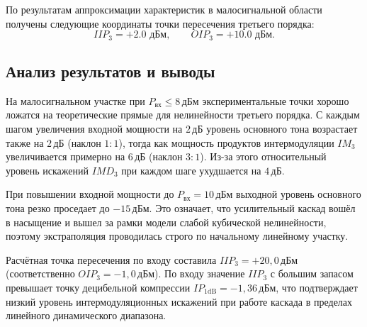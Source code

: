 По результатам аппроксимации характеристик в малосигнальной области получены следующие координаты точки пересечения третьего порядка:
\begin{equation}
IIP_3 = +2.0\text{ дБм}, \qquad OIP_3 = +10.0\text{ дБм}.
\end{equation}

\subsection{Анализ результатов и выводы}

На малосигнальном участке при $P_{\text{вх}} \le 8$\,дБм экспериментальные точки хорошо ложатся на теоретические прямые для нелинейности третьего порядка. С каждым шагом увеличения входной мощности на $2$\,дБ уровень основного тона возрастает также на $2$\,дБ (наклон $1:1$), тогда как мощность продуктов интермодуляции $IM_3$ увеличивается примерно на $6$\,дБ (наклон $3:1$). Из-за этого относительный уровень искажений $IMD_3$ при каждом шаге ухудшается на $4$\,дБ.

При повышении входной мощности до $P_{\text{вх}} = 10$\,дБм выходной уровень основного тона резко проседает до $-15$\,дБм. Это означает, что усилительный каскад вошёл в насыщение и вышел за рамки модели слабой кубической нелинейности, поэтому экстраполяция проводилась строго по начальному линейному участку.

Расчётная точка пересечения по входу составила $IIP_3 = +20{,}0$\,дБм (соответственно $OIP_3 = -1{,}0$\,дБм). По входу значение $IIP_3$ с большим запасом превышает точку децибельной компрессии $IP_{1\text{dB}} = -1{,}36$\,дБм, что подтверждает низкий уровень интермодуляционных искажений при работе каскада в пределах линейного динамического диапазона.
